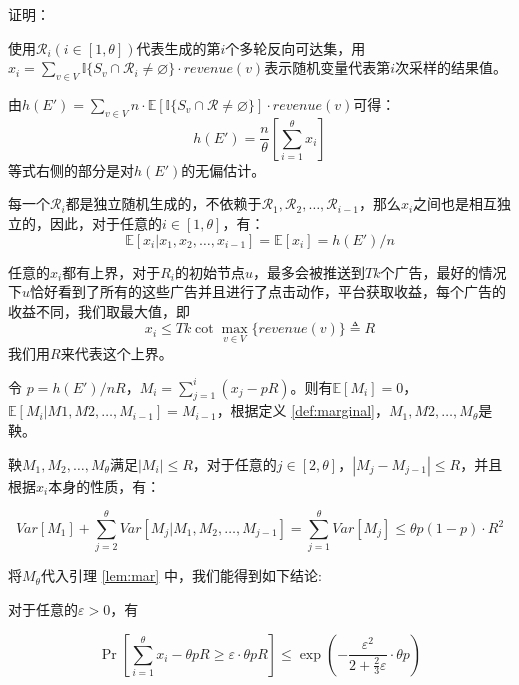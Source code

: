 \noindent 证明：

使用$\mathcal{R}_i(i\in[1,\theta])$代表生成的第$i$个多轮反向可达集，用$x_i=\sum_{v\in V}\mathbb{I}\{S_v\cap\mathcal{R}_i\ne \varnothing  \}\cdot revenue(v)$表示随机变量代表第$i$次采样的结果值。

由$h(E')=\sum_{v \in V} n\cdot\mathbb{E}[\mathbb{I}\{S_v\cap \mathcal{R}\ne \varnothing \}]\cdot revenue(v)$可得：
\begin{equation}
h(E')=\frac{n}{\theta}\left[\sum_{i=1}^{\theta}x_i\right]
\end{equation}
\noindent 等式右侧的部分是对$h(E')$的无偏估计。

每一个$\mathcal{R}_i$都是独立随机生成的，不依赖于$\mathcal{R}_1,\mathcal{R}_2,\ldots,\mathcal{R}_{i-1}$，那么$x_i$之间也是相互独立的，因此，对于任意的$i\in[1,\theta]$，有：
\begin{equation}
\mathbb{E}[x_i|x_1,x_2,\ldots,x_{i-1}]=\mathbb{E}[x_i]=h(E')/n
\end{equation}

任意的$x_i$都有上界，对于$R_i$的初始节点$u$，最多会被推送到$Tk$个广告，最好的情况下$u$恰好看到了所有的这些广告并且进行了点击动作，平台获取收益，每个广告的收益不同，我们取最大值，即
\begin{equation}
x_i\le Tk\cot \max_{v\in V}\{revenue(v)\}\triangleq R
\end{equation}
\noindent 我们用$R$来代表这个上界。

令 $p=h(E')/nR$，$M_i=\sum_{j=1}^{i}(x_j-pR)$。则有$\mathbb{E}[M_i]=0$，$\mathbb{E}[M_i|M1,M2,\ldots,M_{i-1}]=M_{i-1}$，根据定义 \ref{def:marginal}，$M_1,M2,\ldots,M_\theta$是鞅。

鞅$M_1,M_2,\ldots,M_\theta$满足$|M_i|\le R$，对于任意的$j\in [2,\theta]$，$|M_j-M_{j-1}|\le R$，并且根据$x_i$本身的性质，有：

\begin{equation}
    Var[M_1]+\sum_{j=2}^{\theta}Var[M_j|M_1,M_2,\ldots,M_{j-1}]=\sum_{j=1}^{\theta}Var[M_j] \le \theta p(1-p)\cdot R^2
\end{equation}

将$M_\theta$代入引理 \ref{lem:mar} 中，我们能得到如下结论:

对于任意的$\varepsilon > 0$，有

\begin{equation}
\Pr\left[\sum_{i=1}^{\theta}x_i- \theta pR \ge \varepsilon \cdot \theta p R\right] \le \exp(-\frac{\varepsilon^2}{2+\frac{2}{3}\varepsilon}\cdot \theta p)
\end{equation}

